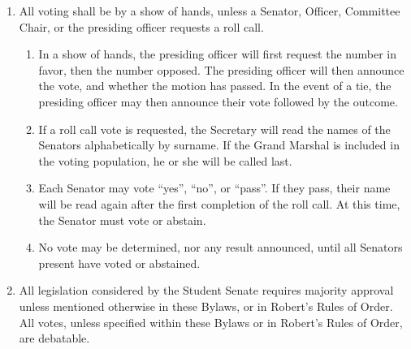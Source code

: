 \begin{enumerate}
\item All voting shall be by a show of hands, unless a Senator, Officer, Committee Chair, or the presiding officer requests a roll call.
\begin{enumerate}
\item In a show of hands, the presiding officer will first request the number in favor, then the number opposed. The presiding
officer will then announce the vote, and whether the motion has passed. In the event of a tie, the presiding officer may then
announce their vote followed by the outcome.
\item If a roll call vote is requested, the Secretary will read the names of the Senators alphabetically by surname. If the Grand
Marshal is included in the voting population, he or she will be called last.
\item Each Senator may vote “yes”, “no”, or “pass”. If they pass, their name will be read again after the first completion of the
roll call. At this time, the Senator must vote or abstain.
\item No vote may be determined, nor any result announced, until all Senators present have voted or abstained.
\end{enumerate}

\item All legislation considered by the Student Senate requires majority approval unless mentioned otherwise in these Bylaws, or in
Robert’s Rules of Order. All votes, unless specified within these Bylaws or in Robert’s Rules of Order, are debatable.
\end{enumerate}